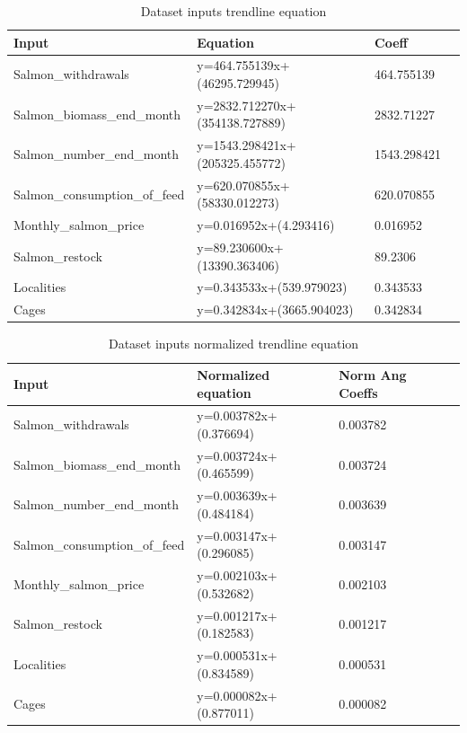 \begin{table}[ht] 
	\centering
    \begin{tabular}{ | l | l | l | p{5cm} |}
        \hline
        Input 								& Equation 							& Coeff			\\ \hline
          	Salmon\_withdrawals 			& y=464.755139x+(46295.729945) 		& 464.755139 	\\ \hline
          	Salmon\_biomass\_end\_month 	& y=2832.712270x+(354138.727889) 	& 2832.71227 	\\ \hline
          	Salmon\_number\_end\_month 		& y=1543.298421x+(205325.455772)	& 1543.298421 	\\ \hline
          	Salmon\_consumption\_of\_feed 	& y=620.070855x+(58330.012273) 		& 620.070855	\\ \hline
           	Monthly\_salmon\_price 			& y=0.016952x+(4.293416) 			& 0.016952 		\\ \hline
          	Salmon\_restock 				& y=89.230600x+(13390.363406)		& 89.2306 		\\ \hline
 			Localities 						& y=0.343533x+(539.979023) 			& 0.343533		\\ \hline
  			Cages 							& y=0.342834x+(3665.904023) 		& 0.342834 		\\ \hline
    \end{tabular} 
    \caption{Dataset inputs trendline equation}
    \label{table: trendline} 
\end{table}
\begin{table}[ht] 
	\centering
    \begin{tabular}{ | l | l | l | p{5cm} |}
        \hline
        Input 							& Normalized equation 	& Norm Ang Coeffs	\\ \hline
          	Salmon\_withdrawals 		& y=0.003782x+(0.376694)& 0.003782			\\ \hline
          	Salmon\_biomass\_end\_month & y=0.003724x+(0.465599)& 0.003724			\\ \hline
          	Salmon\_number\_end\_month 	& y=0.003639x+(0.484184)& 0.003639			\\ \hline
          	Salmon\_consumption\_of\_feed & y=0.003147x+(0.296085)& 0.003147		\\ \hline
           	Monthly\_salmon\_price 		& y=0.002103x+(0.532682)& 0.002103			\\ \hline
          	Salmon\_restock 			& y=0.001217x+(0.182583)& 0.001217			\\ \hline
 			Localities 					& y=0.000531x+(0.834589)& 0.000531			\\ \hline
  			Cages 						& y=0.000082x+(0.877011)& 0.000082			\\ \hline
    \end{tabular} 
    \caption{Dataset inputs normalized trendline equation}
    \label{table: norm_trendline} 
\end{table}

